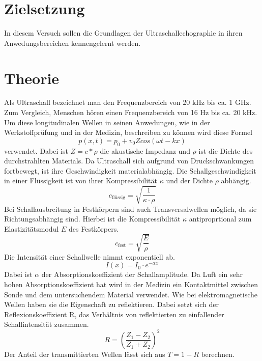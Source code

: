 \section{Zielsetzung}
In diesem Versuch sollen die Grundlagen der Ultraschallechographie
in ihren Anwedungsbereichen kennengelernt werden.
\section{Theorie}
Als Ultraschall bezeichnet man den Frequenzbereich von 20 kHz bis ca. 1 GHz.
Zum Vergleich, Menschen hören einen Frequenzbereich von 16 Hz bis ca. 20 kHz.
Um diese longitudinalen Wellen in seinen Anwedungen, wie in der Werkstoffprüfung
und in der Medizin, beschreiben zu können wird diese Formel
\begin{equation*}
  p(x,t)= p_0 + v_0 Z cos(\omega t - k x)
\end{equation*}
verwendet.
Dabei ist $Z = c* \rho$ die akustische Impedanz und $\rho$ ist die Dichte des durchstrahlten Materials.
Da Ultraschall sich aufgrund von Druckschwankungen fortbewegt, ist ihre Geschwindigkeit materialabhängig.
Die Schallgeschwindigkeit in einer Flüssigkeit ist von ihrer Kompressibilität $\kappa$ und der Dichte $\rho$
abhängig.
\begin{equation*}
  c_{\text{flüssig}} = \sqrt{\frac{1}{\kappa \cdot \rho}}
\end{equation*}
Bei Schallausbreitung in Festkörpern sind auch Transversalwellen möglich, da sie Richtungsabhängig sind.
Hierbei ist die Kompressibilität $\kappa$ antiproprtional zum Elastizitätsmodul $E$ des Festkörpers.
\begin{equation*}
  c_{\text{fest}} = \sqrt{\frac{E}{\rho}}
\end{equation*}
Die Intensität einer Schallwelle nimmt exponentiell ab.
\begin{equation}
  I(x) =I_0 \cdot e^{-\alpha x}
  \label{eq:4}
\end{equation}
Dabei  ist $\alpha$ der Absorptionskoeffizient der Schallamplitude.
Da Luft ein sehr hohen Absorptionskoeffizient hat wird in der Medizin ein Kontaktmittel
zwischen Sonde und dem untersuchendem Material verwendet.
Wie bei elektromagnetische Wellen haben sie die Eigenschaft zu reflektieren.
Dabei setzt sich der Reflexionskoeffizient R, das Verhältnis von reflektierten zu einfallender Schallintensität zusammen.
\begin{equation*}
  R = \left(\frac{Z_1 - Z_2} {Z_1 + Z_2}\right)^2
\end{equation*}
Der Anteil der transmittierten Wellen lässt sich aus $T=1-R$ berechnen.
